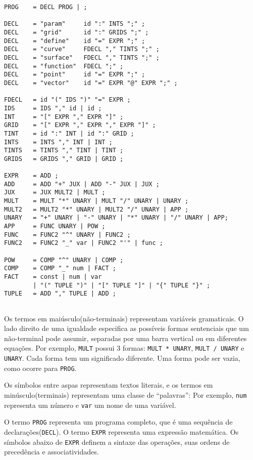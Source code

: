 \newpage
\begin{lstlisting}[caption=Gramática livre de contexto,label=gram]
PROG    = DECL PROG | ;

DECL    = "param"     id ":" INTS ";" ;
DECL    = "grid"      id ":" GRIDS ";" ;
DECL    = "define"    id "=" EXPR ";" ;
DECL    = "curve"     FDECL "," TINTS ";" ;
DECL    = "surface"   FDECL "," TINTS ";" ;
DECL    = "function"  FDECL ";" ;
DECL    = "point"     id "=" EXPR ";" ;
DECL    = "vector"    id "=" EXPR "@" EXPR ";" ;

FDECL   = id "(" IDS ")" "=" EXPR ;
IDS     = IDS "," id | id ;
INT     = "[" EXPR "," EXPR "]" ;
GRID    = "[" EXPR "," EXPR "," EXPR "]" ;
TINT    = id ":" INT | id ":" GRID ;
INTS    = INTS "," INT | INT ;
TINTS   = TINTS "," TINT | TINT ;
GRIDS   = GRIDS "," GRID | GRID ;

EXPR    = ADD ;
ADD     = ADD "+" JUX | ADD "-" JUX | JUX ;
JUX     = JUX MULT2 | MULT ;
MULT    = MULT "*" UNARY | MULT "/" UNARY | UNARY ;
MULT2   = MULT2 "*" UNARY | MULT2 "/" UNARY | APP ;
UNARY   = "+" UNARY | "-" UNARY | "*" UNARY | "/" UNARY | APP;
APP     = FUNC UNARY | POW ;
FUNC    = FUNC2 "^" UNARY | FUNC2 ;
FUNC2   = FUNC2 "_" var | FUNC2 "'" | func ;

POW     = COMP "^" UNARY | COMP ;
COMP    = COMP "_" num | FACT ;
FACT    = const | num | var
        | "(" TUPLE ")" | "[" TUPLE "]" | "{" TUPLE "}" ;
TUPLE   = ADD "," TUPLE | ADD ;
    
\end{lstlisting}

Os termos em maiúsculo(não-terminais) representam variáveis gramaticais.
O lado direito de uma igualdade especifica as possíveis formas sentenciais
que um não-terminal pode assumir, 
separadas por uma barra vertical ou em diferentes equações.
Por exemplo, \texttt{MULT} possui 3 formas:
\texttt{MULT * UNARY}, \texttt{MULT / UNARY} e \texttt{UNARY}.
Cada forma tem um significado diferente.
Uma forma pode ser vazia, como ocorre para \texttt{PROG}.

Os símbolos entre aspas representam textos literais,
e os termos em minúsculo(terminais) representam uma classe de ``palavras'':
Por exemplo, \texttt{num} representa um número e \texttt{var} um nome de uma variável.

O termo \texttt{PROG} representa um programa completo,
que é uma sequência de declarações(\texttt{DECL}).
O termo \texttt{EXPR} representa uma expressão matemática.
Os símbolos abaixo de \texttt{EXPR} definem a sintaxe das operações,
suas ordens de precedência e associatividades.

